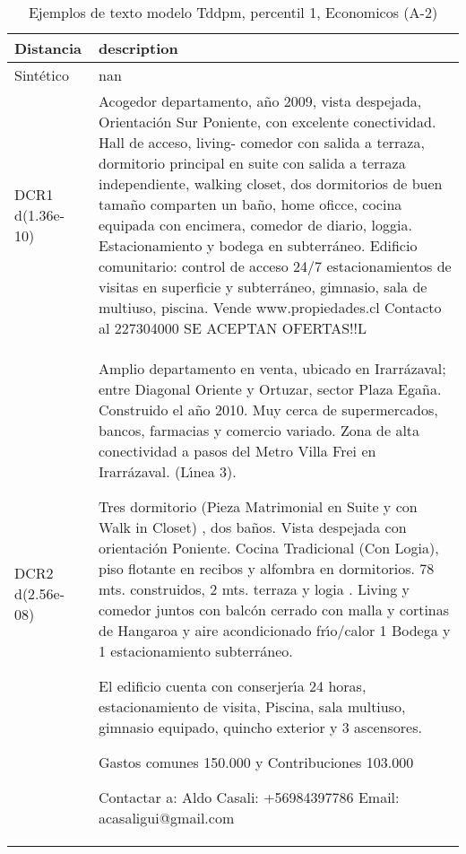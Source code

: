 \begin{table}[H]
\centering
\fontsize{10}{14}\selectfont
\caption{Ejemplos de texto modelo Tddpm, percentil 1, Economicos (A-2)}
\label{table-example-economicos-a-2-tddpm_mlp-1p-text}
\begin{tabular}{|l|m{35em}|}
\hline
\rowcolor[gray]{0.8}
Distancia & description \\
\hline Sintético & nan \\
\hline DCR1 d(1.36e-10) & Acogedor departamento, a\~no 2009, vista despejada, Orientaci\'on Sur Poniente, con excelente conectividad. Hall de acceso, living- comedor con salida a terraza, dormitorio principal en suite con salida a terraza independiente, walking closet, dos dormitorios de buen tama\~no comparten un ba\~no, home oficce, cocina equipada con encimera, comedor de diario, loggia. Estacionamiento y bodega en subterr\'aneo. Edificio comunitario: control de acceso 24/7 estacionamientos de visitas en superficie y subterr\'aneo, gimnasio, sala de multiuso, piscina. Vende www.propiedades.cl Contacto al 227304000 SE ACEPTAN OFERTAS!!L \\
\hline DCR2 d(2.56e-08) & Amplio departamento en venta, ubicado en Irarr\'azaval; entre Diagonal Oriente y Ortuzar, sector Plaza Ega\~na. Construido el a\~no 2010. Muy cerca de supermercados, bancos, farmacias y comercio variado. Zona de alta conectividad a pasos del Metro Villa Frei en Irarr\'azaval. (L{\'\i}nea 3).

Tres dormitorio (Pieza Matrimonial en Suite y con Walk in Closet) , dos ba\~nos. Vista despejada con orientaci\'on Poniente.
Cocina Tradicional (Con Logia), piso flotante en recibos y alfombra en dormitorios.
78 mts. construidos, 2 mts. terraza y logia . Living y comedor juntos con balc\'on cerrado con malla y cortinas de Hangaroa y aire acondicionado fr{\'\i}o/calor
1 Bodega y 1 estacionamiento subterr\'aneo.

El edificio cuenta con conserjer{\'\i}a 24 horas, estacionamiento de visita, Piscina, sala multiuso, gimnasio equipado, quincho exterior  y 3 ascensores.

Gastos comunes 150.000 y Contribuciones 103.000

Contactar a: Aldo Casali: +56984397786
Email: acasaligui@gmail.com \\
\hline
\end{tabular}
\end{table}
